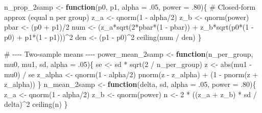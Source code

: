 \documentclass[
  letterpaper,
  DIV=11,
  numbers=noendperiod]{scrreprt}
\newenvironment{Shaded}{\begin{snugshade}}{\end{snugshade}}
\newcommand{\AttributeTok}[1]{\textcolor[rgb]{0.40,0.45,0.13}{#1}}
\newcommand{\CommentTok}[1]{\textcolor[rgb]{0.37,0.37,0.37}{#1}}
\newcommand{\ControlFlowTok}[1]{\textcolor[rgb]{0.00,0.23,0.31}{\textbf{#1}}}
\newcommand{\DecValTok}[1]{\textcolor[rgb]{0.68,0.00,0.00}{#1}}
\newcommand{\FunctionTok}[1]{\textcolor[rgb]{0.28,0.35,0.67}{#1}}
\newcommand{\NormalTok}[1]{\textcolor[rgb]{0.00,0.23,0.31}{#1}}
\newcommand{\OtherTok}[1]{\textcolor[rgb]{0.00,0.23,0.31}{#1}}
\newcommand{\SpecialCharTok}[1]{\textcolor[rgb]{0.37,0.37,0.37}{#1}}
\begin{document}
\begin{Shaded}
\begin{Highlighting}[]
\NormalTok{n\_prop\_2samp }\OtherTok{\textless{}{-}} \ControlFlowTok{function}\NormalTok{(p0, p1, }\AttributeTok{alpha =}\NormalTok{ .}\DecValTok{05}\NormalTok{, }\AttributeTok{power =}\NormalTok{ .}\DecValTok{80}\NormalTok{)\{}
  \CommentTok{\# Closed{-}form approx (equal n per group)}
\NormalTok{  z\_a }\OtherTok{\textless{}{-}} \FunctionTok{qnorm}\NormalTok{(}\DecValTok{1} \SpecialCharTok{{-}}\NormalTok{ alpha}\SpecialCharTok{/}\DecValTok{2}\NormalTok{)}
\NormalTok{  z\_b }\OtherTok{\textless{}{-}} \FunctionTok{qnorm}\NormalTok{(power)}
\NormalTok{  pbar }\OtherTok{\textless{}{-}}\NormalTok{ (p0 }\SpecialCharTok{+}\NormalTok{ p1)}\SpecialCharTok{/}\DecValTok{2}
\NormalTok{  num }\OtherTok{\textless{}{-}}\NormalTok{ (z\_a}\SpecialCharTok{*}\FunctionTok{sqrt}\NormalTok{(}\DecValTok{2}\SpecialCharTok{*}\NormalTok{pbar}\SpecialCharTok{*}\NormalTok{(}\DecValTok{1} \SpecialCharTok{{-}}\NormalTok{ pbar)) }\SpecialCharTok{+}\NormalTok{ z\_b}\SpecialCharTok{*}\FunctionTok{sqrt}\NormalTok{(p0}\SpecialCharTok{*}\NormalTok{(}\DecValTok{1} \SpecialCharTok{{-}}\NormalTok{ p0) }\SpecialCharTok{+}\NormalTok{ p1}\SpecialCharTok{*}\NormalTok{(}\DecValTok{1} \SpecialCharTok{{-}}\NormalTok{ p1)))}\SpecialCharTok{\^{}}\DecValTok{2}
\NormalTok{  den }\OtherTok{\textless{}{-}}\NormalTok{ (p1 }\SpecialCharTok{{-}}\NormalTok{ p0)}\SpecialCharTok{\^{}}\DecValTok{2}
  \FunctionTok{ceiling}\NormalTok{(num }\SpecialCharTok{/}\NormalTok{ den)}
\NormalTok{\}}

\CommentTok{\# {-}{-}{-}{-} Two{-}sample means {-}{-}{-}{-}}
\NormalTok{power\_mean\_2samp }\OtherTok{\textless{}{-}} \ControlFlowTok{function}\NormalTok{(n\_per\_group, mu0, mu1, sd, }\AttributeTok{alpha =}\NormalTok{ .}\DecValTok{05}\NormalTok{)\{}
\NormalTok{  se }\OtherTok{\textless{}{-}}\NormalTok{ sd }\SpecialCharTok{*} \FunctionTok{sqrt}\NormalTok{(}\DecValTok{2} \SpecialCharTok{/}\NormalTok{ n\_per\_group)}
\NormalTok{  z  }\OtherTok{\textless{}{-}} \FunctionTok{abs}\NormalTok{(mu1 }\SpecialCharTok{{-}}\NormalTok{ mu0) }\SpecialCharTok{/}\NormalTok{ se}
\NormalTok{  z\_alpha }\OtherTok{\textless{}{-}} \FunctionTok{qnorm}\NormalTok{(}\DecValTok{1} \SpecialCharTok{{-}}\NormalTok{ alpha}\SpecialCharTok{/}\DecValTok{2}\NormalTok{)}
  \FunctionTok{pnorm}\NormalTok{(z }\SpecialCharTok{{-}}\NormalTok{ z\_alpha) }\SpecialCharTok{+}\NormalTok{ (}\DecValTok{1} \SpecialCharTok{{-}} \FunctionTok{pnorm}\NormalTok{(z }\SpecialCharTok{+}\NormalTok{ z\_alpha))}
\NormalTok{\}}
\NormalTok{n\_mean\_2samp }\OtherTok{\textless{}{-}} \ControlFlowTok{function}\NormalTok{(delta, sd, }\AttributeTok{alpha =}\NormalTok{ .}\DecValTok{05}\NormalTok{, }\AttributeTok{power =}\NormalTok{ .}\DecValTok{80}\NormalTok{)\{}
\NormalTok{  z\_a }\OtherTok{\textless{}{-}} \FunctionTok{qnorm}\NormalTok{(}\DecValTok{1} \SpecialCharTok{{-}}\NormalTok{ alpha}\SpecialCharTok{/}\DecValTok{2}\NormalTok{)}
\NormalTok{  z\_b }\OtherTok{\textless{}{-}} \FunctionTok{qnorm}\NormalTok{(power)}
\NormalTok{  n }\OtherTok{\textless{}{-}} \DecValTok{2} \SpecialCharTok{*}\NormalTok{ ((z\_a }\SpecialCharTok{+}\NormalTok{ z\_b) }\SpecialCharTok{*}\NormalTok{ sd }\SpecialCharTok{/}\NormalTok{ delta)}\SpecialCharTok{\^{}}\DecValTok{2}
  \FunctionTok{ceiling}\NormalTok{(n)}
\NormalTok{\}}


\end{Highlighting}
\end{Shaded}
\end{document}

